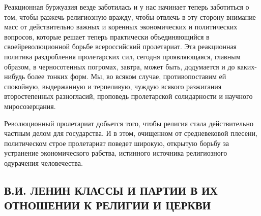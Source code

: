 \documentclass[12pt]{article}
\newcommand{\parnum}{(\arabic{parcount})}
\newcounter{parcount}
\newenvironment{parnumbers}{%
  \par%
  \everypar{\noindent \stepcounter{parcount}\marginpar[]{\parnum}}%
}{}
\begin{document}
\begin{parnumbers}
Реакционная буржуазия везде заботилась и у нас начинает теперь заботиться о том, чтобы разжечь религиозную вражду, чтобы отвлечь в эту сторону внимание масс от действительно важных и коренных экономических и политических вопросов, которые решает теперь практически объединяющийся в своейреволюционной борьбе всероссийский пролетариат. Эта реакционная политика раздробления пролетарских сил, сегодня проявляющаяся, главным образом, в черносотенных погромах, завтра, может быть, додумается и до каких-нибудь более тонких форм. Мы, во всяком случае, противопоставим ей спокойную, выдержанную и терпеливую, чуждую всякого разжигания второстепенных разногласий, проповедь пролетарской солидарности и научного миросозерцания.

Революционный пролетариат добьется того, чтобы религия стала действительно частным делом для государства. И в этом, очищенном от средневековой плесени, политическом строе пролетариат поведет широкую, открытую борьбу за устранение экономического рабства, истинного источника религиозного одурачения человечества.
\end{parnumbers}

\subsection{В.И. ЛЕНИН КЛАССЫ И ПАРТИИ В ИХ ОТНОШЕНИИ К РЕЛИГИИ И ЦЕРКВИ}
\end{document}
